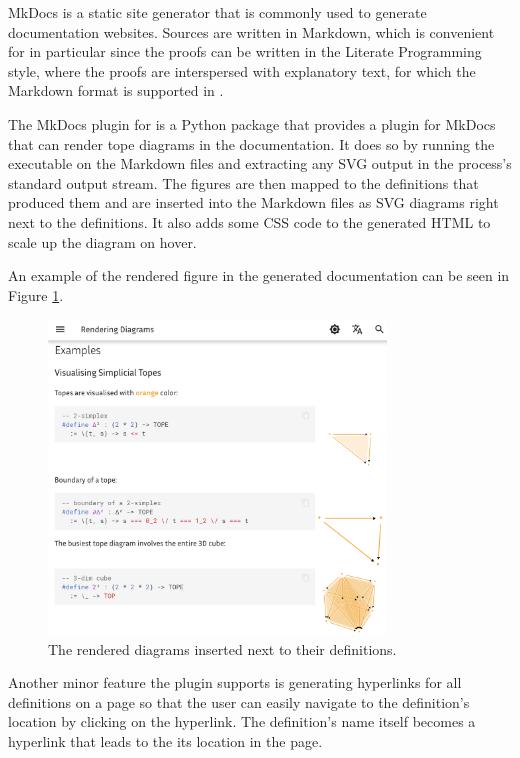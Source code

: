 MkDocs is a static site generator that is commonly used to generate documentation websites.
Sources are written in Markdown, which is convenient for \Rzk{} in particular since the \Rzk{}
proofs can be written in the Literate Programming style, where the proofs are interspersed with
explanatory text, for which the Markdown format is supported in \Rzk{}.

The MkDocs plugin for \Rzk{} is a Python package that provides a plugin for MkDocs that can render
tope diagrams in the documentation.
It does so by running the \Rzk{} executable on the Markdown files and extracting any SVG
output in the process's standard output stream.
The figures are then mapped to the definitions that produced them and are inserted into the
Markdown files as SVG diagrams right next to the definitions.
It also adds some CSS code to the generated HTML to scale up the diagram on hover.

An example of the rendered figure in the generated documentation can be seen in Figure \ref{figure:svg-rendering}.
\begin{figure}
  \centering
  \includegraphics[width=0.8\textwidth]{figs/svg-rendering.png}
  \caption{The rendered diagrams inserted next to their definitions.}
  \label{figure:svg-rendering}
\end{figure}

Another minor feature the plugin supports is generating hyperlinks for all definitions on a page
so that the user can easily navigate to the definition's location by clicking on the hyperlink.
The definition's name itself becomes a hyperlink that leads to the its location in the page.


